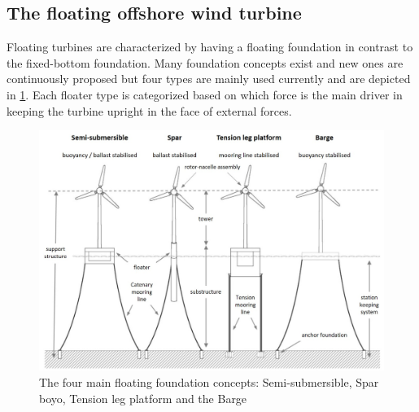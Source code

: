 \subsection{The floating offshore wind turbine}
Floating turbines are characterized by having a floating foundation in contrast to the fixed-bottom foundation. Many foundation concepts exist and new ones are continuously proposed but four types are mainly used currently and are depicted in \cref{fig:floating_concepts}. Each floater type is categorized based on which force is the main driver in keeping the turbine upright in the face of external forces.
\begin{figure}[h]
	\centering
	\includegraphics[width=1\linewidth]{Graphics/FloatingFoundationConcepts.jpg}
	\caption{The four main floating foundation concepts: Semi-submersible, Spar boyo, Tension leg platform and the Barge \cite{DNV-GL2018}}
	\label{fig:floating_concepts}
\end{figure}


